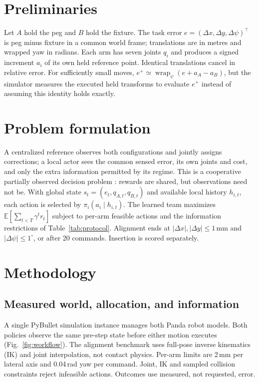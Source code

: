\documentclass{article}
\begin{document}
\section{Preliminaries}
Let $A$ hold the peg and $B$ hold the fixture. The task error $e=(\Delta x,\Delta y,\Delta\psi)^\top$ is peg minus fixture in a common world frame; translations are in metres and wrapped yaw in radians. Each arm has seven joints $q_i$ and produces a signed increment $a_i$ of its own held reference point. Identical translations cancel in relative error. For sufficiently small moves, $e^+\simeq\operatorname{wrap}_\psi(e+a_A-a_B)$, but the simulator measures the executed held transforms to evaluate $e^+$ instead of assuming this identity holds exactly.

\section{Problem formulation}
A centralized reference observes both configurations and jointly assigns corrections; a local actor sees the common sensed error, its own joints and cost, and only the extra information permitted by its regime. This is a cooperative partially observed decision problem \cite{bernstein}: rewards are shared, but observations need not be. With global state $s_t=(e_t,q_{A,t},q_{B,t})$ and available local history $h_{i,t}$, each action is selected by $\pi_i(a_i\mid h_{i,t})$. The learned team maximizes $\mathbb E[\sum_{t<T}\gamma^t r_t]$ subject to per-arm feasible actions and the information restrictions of Table~\ref{tab:protocol}. Alignment ends at $|\Delta x|,|\Delta y|\leq 1$\,mm and $|\Delta\psi|\leq 1^\circ$, or after 20 commands. Insertion is scored separately.

\clearpage
\section{Methodology}
\subsection{Measured world, allocation, and information}
A single PyBullet simulation instance manages both Panda robot models. Both policies observe the same pre-step state before either motion executes (Fig.~\ref{fig:workflow}). The alignment benchmark uses full-pose inverse kinematics (IK) and joint interpolation, not contact physics. Per-arm limits are 2\,mm per lateral axis and 0.04\,rad yaw per command. Joint, IK and sampled collision constraints reject infeasible actions. Outcomes use measured, not requested, error.
\end{document}
